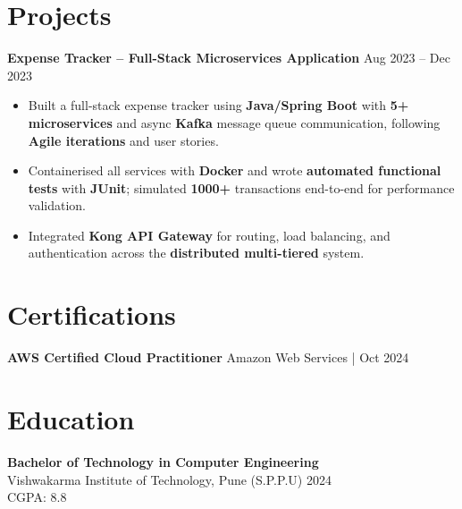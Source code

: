 \documentclass[a4paper,10pt]{article}
\begin{document}
\section*{Projects}

\textbf{Expense Tracker -- Full-Stack Microservices Application} \hfill Aug 2023 -- Dec 2023
\begin{itemize}[leftmargin=*]
    \item Built a full-stack expense tracker using \textbf{Java/Spring Boot} with \textbf{5+ microservices} and async \textbf{Kafka} message queue communication, following \textbf{Agile iterations} and user stories.
    \item Containerised all services with \textbf{Docker} and wrote \textbf{automated functional tests} with \textbf{JUnit}; simulated \textbf{1000+} transactions end-to-end for performance validation.
    \item Integrated \textbf{Kong API Gateway} for routing, load balancing, and authentication across the \textbf{distributed multi-tiered} system.
\end{itemize}

\section*{Certifications}
\textbf{AWS Certified Cloud Practitioner} \hfill Amazon Web Services \;|\; Oct 2024 \\

\section*{Education}

\textbf{Bachelor of Technology in Computer Engineering} \\
Vishwakarma Institute of Technology, Pune (S.P.P.U) \hfill 2024 \\
CGPA: 8.8
\end{document}

